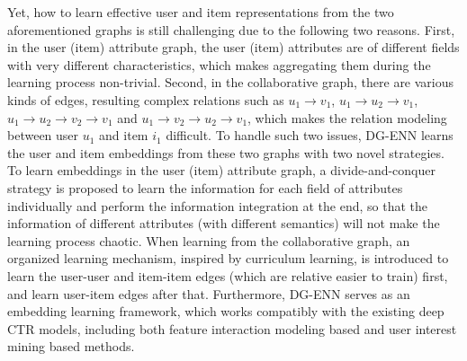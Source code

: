 Yet, how to learn effective user and item representations from the two aforementioned graphs is still challenging due to the following two reasons. First, in the user (item) attribute graph, the user (item) attributes are of different fields with very different characteristics, which makes aggregating them during the learning process non-trivial. Second, in the collaborative graph, there are various kinds of edges, resulting complex relations such as $u_1 \rightarrow v_1$, $u_1 \rightarrow u_2 \rightarrow v_1$, $u_1 \rightarrow u_2 \rightarrow v_2 \rightarrow v_1$ and $u_1 \rightarrow v_2 \rightarrow u_2 \rightarrow v_1$, which makes the relation modeling between user $u_1$ and item $i_1$ difficult.
To handle such two issues, DG-ENN learns the user and item embeddings from these two graphs with two novel strategies. To learn embeddings in the user (item) attribute graph, a divide-and-conquer strategy is proposed to learn the information for each field of attributes individually and perform the information integration at the end, so that the information of different attributes (with different semantics) will not make the learning process chaotic. When learning from the collaborative graph, an organized learning mechanism, inspired by curriculum learning, is introduced to learn the user-user and item-item edges (which are relative easier to train) first, and learn user-item edges after that.
Furthermore, DG-ENN serves as an embedding learning framework, which works compatibly with the existing deep CTR models, including both feature interaction modeling based and user interest mining based methods.


